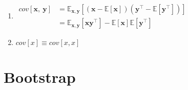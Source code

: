 \begin{multicols}{2}
\begin{enumerate}[series=rvrules]
    \item
    $
        \begin{aligned}
            cov[\bm{x},\ \bm{y}]
                & = \mathbb{E}_{\bm{x},\bm{y}} [(\bm{x} - \mathbb{E}[\bm{x}]) (\bm{y}^\top - \mathbb{E}[\bm{y}^\top])] \\
                & = \mathbb{E}_{\bm{x},\bm{y}} [\bm{xy}^\top] - \mathbb{E}[\bm{x}]\mathbb{E}[\bm{y}^\top]
        \end{aligned}
    $
    \hfill \cite{ml/book/Pattern-Recognition-And-Machine-Learning/Christopher-M-Bishop}

    \item $ cov[x] \equiv cov[x,x] $
    \hfill \cite{ml/book/Pattern-Recognition-And-Machine-Learning/Christopher-M-Bishop}
\end{enumerate}
\end{multicols}






\section{Bootstrap}


